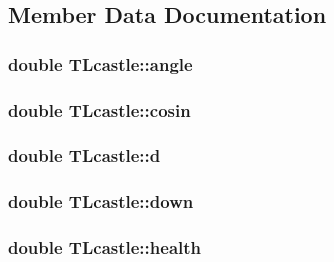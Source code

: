 \subsection{Member Data Documentation}
\subsubsection[{\texorpdfstring{angle}{angle}}]{\setlength{\rightskip}{0pt plus 5cm}double T\+Lcastle\+::angle}\hypertarget{struct_t_lcastle_ace89c8b9761bfbe1047c651b29f52c5a}{}\label{struct_t_lcastle_ace89c8b9761bfbe1047c651b29f52c5a}
\subsubsection[{\texorpdfstring{cosin}{cosin}}]{\setlength{\rightskip}{0pt plus 5cm}double T\+Lcastle\+::cosin}\hypertarget{struct_t_lcastle_a03a0cd8c4cfe056ffcc8400a318ff27c}{}\label{struct_t_lcastle_a03a0cd8c4cfe056ffcc8400a318ff27c}
\subsubsection[{\texorpdfstring{d}{d}}]{\setlength{\rightskip}{0pt plus 5cm}double T\+Lcastle\+::d}\hypertarget{struct_t_lcastle_a17656e3c94fa799168beb6e5e89f7d0d}{}\label{struct_t_lcastle_a17656e3c94fa799168beb6e5e89f7d0d}
\subsubsection[{\texorpdfstring{down}{down}}]{\setlength{\rightskip}{0pt plus 5cm}double T\+Lcastle\+::down}\hypertarget{struct_t_lcastle_a244b75b31e22fa23d057b35be4c31447}{}\label{struct_t_lcastle_a244b75b31e22fa23d057b35be4c31447}
\subsubsection[{\texorpdfstring{health}{health}}]{\setlength{\rightskip}{0pt plus 5cm}double T\+Lcastle\+::health}\hypertarget{struct_t_lcastle_a6682d2dcaa15a3456c64ec46e5904046}{}\label{struct_t_lcastle_a6682d2dcaa15a3456c64ec46e5904046}
